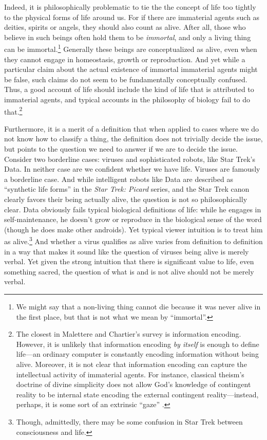Indeed, it is philosophically problematic to tie the the concept of life too tightly to the physical forms of life around us. For if there are immaterial agents such as deities, spirits or angels, they should also count as alive.
 After all, those who believe in such beings often
hold them to be \textit{immortal}, and only a living thing can be immortal.\footnote{We might say that a non-living
thing cannot die because it was never alive in the first place, but that is not what we mean by ``immortal''.}
Generally these beings are conceptualized as alive, even when they cannot engage in homeostasis, growth or reproduction. And yet while a particular 
claim about the actual existence of immortal immaterial agents might be false, such claims do not seem to be fundamentally conceptually confused. Thus, a good account
of life should include the kind of life that is attributed to immaterial agents, and typical accounts in the philosophy of biology fail to do that.\footnote{The closest in Malettere and Chartier's survey is information encoding. However,
it is unlikely that information encoding \textit{by itself} is enough to define life---an ordinary computer is
constantly encoding information without being alive. Moreover, it is not clear that information encoding can capture
the intellectual activity of immaterial agents. For instance, classical theism's doctrine of divine simplicity 
does not allow God's knowledge of contingent reality to be internal state encoding the external contingent reality---instead, perhaps, it is some sort of an extrinsic ``gaze'' \parencite{GrantSimplicity}.}

Furthermore, it is a merit of a definition that when applied to cases where we do not know how to classify a thing, the definition does not trivially
decide the issue, but points to the question we need to answer if we are to decide the issue. Consider two borderline cases: viruses
and sophisticated robots, like Star Trek's Data. In neither case are we confident whether we have life. Viruses are famously a borderline case.
And while intelligent robots like Data are described as ``synthetic life forms'' in the \textit{Star Trek: Picard}
series, and the Star Trek canon clearly favors their being actually alive, the question is
not so philosophically clear. Data obviously fails typical biological definitions of life: while he engages in self-maintenance, he doesn't grow or
reproduce in the biological sense of the word (though he does make other androids). Yet typical viewer intuition
is to treat him as alive.\footnote{Though,
admittedly, there may be some confusion in Star Trek between consciousness and life.} And
whether a virus qualifies as alive varies from definition
to definition in a way that makes it sound like the question of viruses being alive is merely verbal. Yet given the strong intuition that there
is significant value to life, even something sacred, the question of what is and is not alive should not be merely verbal.

